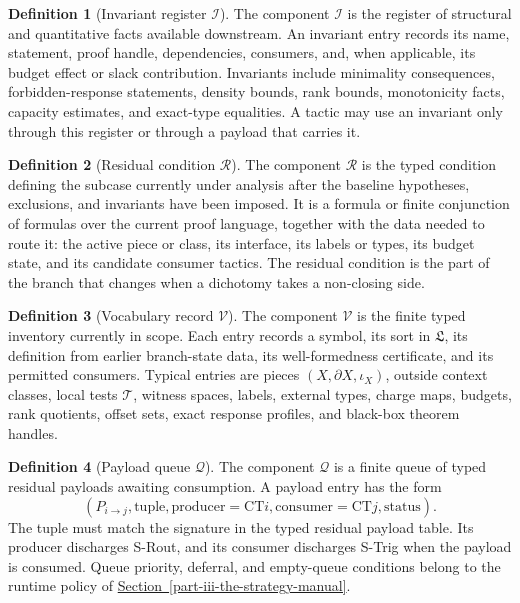 \documentclass[
  11pt,
]{article}
\theoremstyle{definition}
\newtheorem{definition}{Definition}[section]
\newcommand{\secref}[1]{\hyperref[#1]{Section~\ref*{#1}}}
\begin{document}
\begin{definition}[Invariant register \(\mathcal I\)]\label{def:invariant-register}
The component \(\mathcal I\) is the register of structural and
quantitative facts available downstream.  An invariant entry records its
name, statement, proof handle, dependencies, consumers, and, when
applicable, its budget effect or slack contribution.  Invariants include
minimality consequences, forbidden-response statements, density bounds,
rank bounds, monotonicity facts, capacity estimates, and exact-type
equalities.  A tactic may use an invariant only through this register or
through a payload that carries it.
\end{definition}

\begin{definition}[Residual condition \(\mathcal R\)]\label{def:residual-condition}
The component \(\mathcal R\) is the typed condition defining the subcase
currently under analysis after the baseline hypotheses, exclusions, and
invariants have been imposed.  It is a formula or finite conjunction of
formulas over the current proof language, together with the data needed
to route it: the active piece or class, its interface, its labels or
types, its budget state, and its candidate consumer tactics.  The
residual condition is the part of the branch that changes when a
dichotomy takes a non-closing side.
\end{definition}

\begin{definition}[Vocabulary record \(\mathcal V\)]\label{def:vocabulary-record}
The component \(\mathcal V\) is the finite typed inventory currently in
scope.  Each entry records a symbol, its sort in \(\mathfrak L\), its
definition from earlier branch-state data, its well-formedness
certificate, and its permitted consumers.  Typical entries are pieces
\((X,\partial X,\iota_X)\), outside context classes, local tests
\(\mathcal T\), witness spaces, labels, external types, charge maps,
budgets, rank quotients, offset sets, exact response profiles, and
black-box theorem handles.
\end{definition}

\begin{definition}[Payload queue \(\mathcal Q\)]\label{def:payload-queue}
The component \(\mathcal Q\) is a finite queue of typed residual payloads
awaiting consumption.  A payload entry has the form
\[
(P_{i\to j},\mathrm{tuple},\mathrm{producer}=\mathrm{CT}i,
  \mathrm{consumer}=\mathrm{CT}j,\mathrm{status}).
\]
The tuple must match the signature in the typed residual payload table.
Its producer discharges S-Rout, and its consumer discharges S-Trig when
the payload is consumed.  Queue priority, deferral, and empty-queue
conditions belong to the runtime policy of
\secref{part-iii-the-strategy-manual}.
\end{definition}
\end{document}
